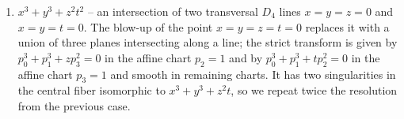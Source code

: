 \documentclass[a4paper]{amsart}
\theoremstyle{plain}
\theoremstyle{definition}
\theoremstyle{remark}
\numberwithin{equation}{section}
\begin{document}
\begin{enumerate}[itemsep=2mm plus 2mm]

Consequently
\[
\Delta N_{c}=1,\;\; \Delta e=(9-4)-1+(2-1)+(2-1)+(2-1)+(2-1)=8.
\]
\item $x^3 + y^3 + z^2 t^2$ -- an intersection of two transversal $D_{4}$ lines $x=y=z=0$ and $x=y=t=0$. The blow-up of the point $x=y=z=t=0$ replaces it with a union of three planes intersecting along a line; the strict transform
is given by $p_{0}^{3}+p_{1}^{3}+zp_{3}^{2}=0$ in the affine chart $p_{2}=1$ and by $p_{0}^{3}+p_{1}^{3}+tp_{2}^{2}=0$ in the affine chart $p_{3}=1$ and smooth in remaining charts.
It has two singularities in the central fiber isomorphic to $x^{3}+y^{3}+z^{2}t$, so we repeat twice the resolution from the previous case.


\end{enumerate}
\end{document}
